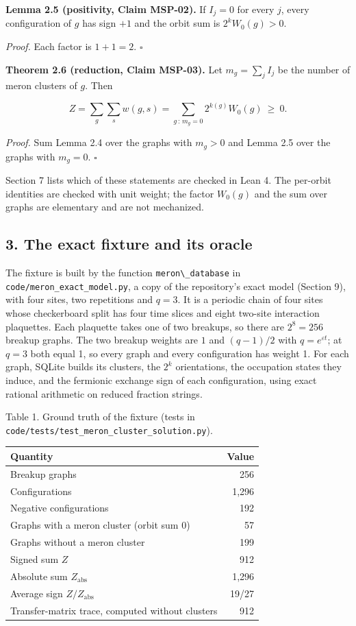 \documentclass[
  11pt,
]{article}
\newcommand{\passthrough}[1]{#1}
\begin{document}
\textbf{Lemma 2.5 (positivity, Claim MSP-02).} If \(I_j = 0\) for every
\(j\), every configuration of \(g\) has sign \(+1\) and the orbit sum is
\(2^{k} W_0(g) > 0\).

\emph{Proof.} Each factor is \(1 + 1 = 2\). \(\square\)

\textbf{Theorem 2.6 (reduction, Claim MSP-03).} Let \(m_g = \sum_j I_j\)
be the number of meron clusters of \(g\). Then

\[Z = \sum_{g} \sum_{s} w(g, s) = \sum_{g \,:\, m_g = 0} 2^{k(g)} W_0(g) \ \ge\ 0 .\]

\emph{Proof.} Sum Lemma 2.4 over the graphs with \(m_g > 0\) and Lemma
2.5 over the graphs with \(m_g = 0\). \(\square\)

Section 7 lists which of these statements are checked in Lean 4. The
per-orbit identities are checked with unit weight; the factor \(W_0(g)\)
and the sum over graphs are elementary and are not mechanized.

\subsection{3. The exact fixture and its
oracle}\label{the-exact-fixture-and-its-oracle}

The fixture is built by the function
\passthrough{\lstinline!meron\_database!} in
\nolinkurl{code/meron_exact_model.py}, a copy of the repository's exact
model (Section 9), with four sites, two repetitions and \(q = 3\). It is
a periodic chain of four sites whose checkerboard split has four time
slices and eight two-site interaction plaquettes. Each plaquette takes
one of two breakups, so there are \(2^8 = 256\) breakup graphs. The two
breakup weights are \(1\) and \((q-1)/2\) with
\(q = e^{\varepsilon t}\); at \(q = 3\) both equal 1, so every graph and
every configuration has weight 1. For each graph, SQLite builds its
clusters, the \(2^k\) orientations, the occupation states they induce,
and the fermionic exchange sign of each configuration, using exact
rational arithmetic on reduced fraction strings.

Table 1. Ground truth of the fixture (tests in
\nolinkurl{code/tests/test_meron_cluster_solution.py}).

\begin{longtable}[]{@{}lr@{}}
\toprule\noalign{}
Quantity & Value \\
\midrule\noalign{}
\endhead
\bottomrule\noalign{}
\endlastfoot
Breakup graphs & 256 \\
Configurations & 1,296 \\
Negative configurations & 192 \\
Graphs with a meron cluster (orbit sum 0) & 57 \\
Graphs without a meron cluster & 199 \\
Signed sum \(Z\) & 912 \\
Absolute sum \(Z_{\mathrm{abs}}\) & 1,296 \\
Average sign \(Z / Z_{\mathrm{abs}}\) & 19/27 \\
Transfer-matrix trace, computed without clusters & 912 \\
\end{longtable}
\end{document}
